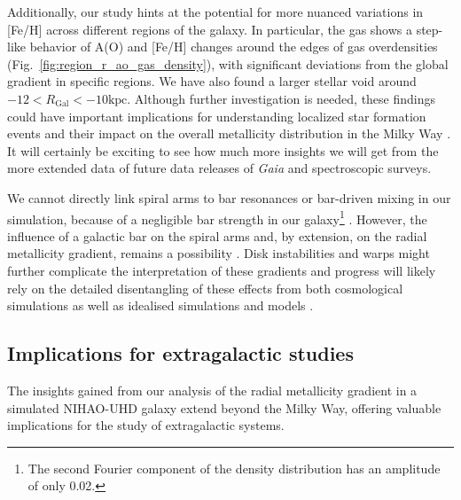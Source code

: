 \documentclass[twocolumn,apj,numberedappendix,appendixfloats,twocolappendix]{openjournal}
\begin{document}
\begin{CJK*}{UTF8}{gbsn}
Additionally, our study hints at the potential for more nuanced variations in [Fe/H] across different regions of the galaxy. In particular, the gas shows a step-like behavior of A(O) and [Fe/H] changes around the edges of gas overdensities (Fig.~\ref{fig:region_r_ao_gas_density}), with significant deviations from the global gradient in specific regions. We have also found a larger stellar void around $-12 < R_\mathrm{Gal} < -10\mathrm{kpc}$. Although further investigation is needed, these findings could have important implications for understanding localized star formation events and their impact on the overall metallicity distribution in the Milky Way \citep{Sanchez2014, SanchezBlazquez2014, Ho2015}. It will certainly be exciting to see how much more insights \citep{Poggio2021, Hackshaw2024} we will get from the more extended data of future data releases of \textit{Gaia} and spectroscopic surveys.

We cannot directly link spiral arms to bar resonances or bar-driven mixing in our simulation, because of a negligible bar strength in our galaxy\footnote{The second Fourier component of the density distribution has an amplitude of only 0.02.} \citep[but see][]{Minchev2010, DiMatteo2013}. However, the influence of a galactic bar on the spiral arms and, by extension, on the radial metallicity gradient, remains a possibility \citep[see again][]{Chen2023}. Disk instabilities and warps might further complicate the interpretation of these gradients and progress will likely rely on the detailed disentangling of these effects from both cosmological simulations as well as idealised simulations and models \citep{Minchev2013, Grand2015, Grand2016, Krumholz2018, Sharda2021, BlandHawthorn2024, TepperGarcia2024}.

\subsection{Implications for extragalactic studies} \label{sec:implications_extragalactic}

The insights gained from our analysis of the radial metallicity gradient in a simulated NIHAO-UHD galaxy extend beyond the Milky Way, offering valuable implications for the study of extragalactic systems.


\end{CJK*}
\end{document}
